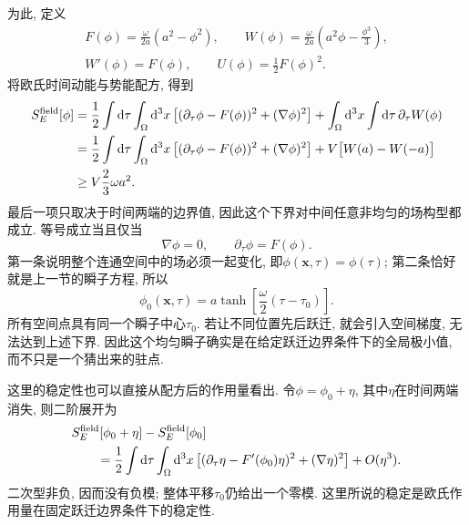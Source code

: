 为此, 定义
\begin{equation}
    \begin{gathered}
        F(\phi)=\frac\omega{2a}(a^2-\phi^2),\qquad
        W(\phi)=\frac\omega{2a}\left(a^2\phi-\frac{\phi^3}{3}\right),\\
        W'(\phi)=F(\phi),\qquad U(\phi)=\frac12F(\phi)^2.
    \end{gathered}
\end{equation}
将欧氏时间动能与势能配方, 得到
\begin{align}\label{ssb-field-action-bound}
    S_E^{\mathrm{field}}[\phi]
    &=\frac12\int\mathrm d\tau\int_\Omega\mathrm d^3x
      \left[(\partial_\tau\phi-F(\phi))^2+(\nabla\phi)^2\right]
      +\int_\Omega\mathrm d^3x\int\mathrm d\tau\,\partial_\tau W(\phi)\notag\\
    &=\frac12\int\mathrm d\tau\int_\Omega\mathrm d^3x
      \left[(\partial_\tau\phi-F(\phi))^2+(\nabla\phi)^2\right]
      +V\big[W(a)-W(-a)\big]\notag\\
    &\geq V\frac23\omega a^2.
\end{align}
最后一项只取决于时间两端的边界值, 因此这个下界对中间任意非均匀的场构型都成立. 等号成立当且仅当
\begin{equation}
    \nabla\phi=0,\qquad \partial_\tau\phi=F(\phi).
\end{equation}
第一条说明整个连通空间中的场必须一起变化, 即$\phi(\mathbf x,\tau)=\phi(\tau)$; 第二条恰好就是上一节的瞬子方程, 所以
\begin{equation}\label{ssb-field-instanton}
    \phi_0(\mathbf x,\tau)
    =a\tanh\left[\frac\omega2(\tau-\tau_0)\right].
\end{equation}
所有空间点具有同一个瞬子中心$\tau_0$. 若让不同位置先后跃迁, 就会引入空间梯度, 无法达到上述下界. 因此这个均匀瞬子确实是在给定跃迁边界条件下的全局极小值, 而不只是一个猜出来的驻点.

这里的稳定性也可以直接从配方后的作用量看出. 令$\phi=\phi_0+\eta$, 其中$\eta$在时间两端消失, 则二阶展开为
\begin{equation}
    \begin{aligned}
        &S_E^{\mathrm{field}}[\phi_0+\eta]
        -S_E^{\mathrm{field}}[\phi_0]\\
        &\qquad=\frac12\int\mathrm d\tau\int_\Omega\mathrm d^3x
          \left[(\partial_\tau\eta-F'(\phi_0)\eta)^2
          +(\nabla\eta)^2\right]+O(\eta^3).
    \end{aligned}
\end{equation}
二次型非负, 因而没有负模; 整体平移$\tau_0$仍给出一个零模. 这里所说的稳定是欧氏作用量在固定跃迁边界条件下的稳定性.

